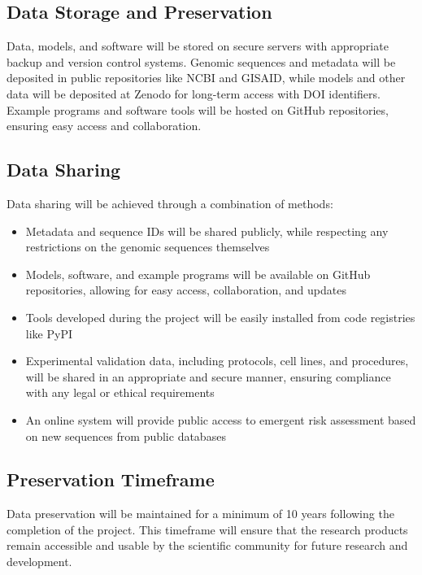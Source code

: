\documentclass[onecolumn, compsoc,12pt]{IEEEtran}
\begin{document}
\subsection{Data Storage and Preservation}

Data, models, and software will be stored on secure servers with appropriate backup and version control systems. Genomic sequences and metadata will be deposited in public repositories like NCBI and GISAID, while models and other data will be deposited at Zenodo for long-term access with DOI identifiers. Example programs and software tools will be hosted on GitHub repositories, ensuring easy access and collaboration.

\subsection{Data Sharing}

Data sharing will be achieved through a combination of methods:

\begin{itemize}
  \item Metadata and sequence IDs will be shared publicly, while respecting any restrictions on the genomic sequences themselves
  \item Models, software, and example programs will be available on GitHub repositories, allowing for easy access, collaboration, and updates
  \item Tools developed during the project will be easily installed from code registries like PyPI
  \item Experimental validation data, including protocols, cell lines, and procedures, will be shared in an appropriate and secure manner, ensuring compliance with any legal or ethical requirements
  \item An online system will provide public access to emergent risk assessment based on new sequences from public databases
\end{itemize}

\subsection{Preservation Timeframe}

Data preservation will be maintained for a minimum of 10 years following the completion of the project. This timeframe will ensure that the research products remain accessible and usable by the scientific community for future research and development.
\end{document}
